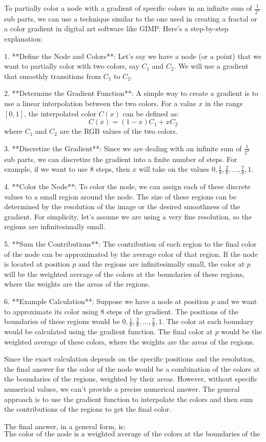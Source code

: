 To partially color a node with a gradient of specific colors in an infinite sum of \(\frac{1}{2^n}\) sub parts, we can use a technique similar to the one used in creating a fractal or a color gradient in digital art software like GIMP. Here's a step-by-step explanation:

1. **Define the Node and Colors**: Let's say we have a node (or a point) that we want to partially color with two colors, say \(C_1\) and \(C_2\). We will use a gradient that smoothly transitions from \(C_1\) to \(C_2\).

2. **Determine the Gradient Function**: A simple way to create a gradient is to use a linear interpolation between the two colors. For a value \(x\) in the range \([0, 1]\), the interpolated color \(C(x)\) can be defined as:
   \[
   C(x) = (1-x)C_1 + xC_2
   \]
   where \(C_1\) and \(C_2\) are the RGB values of the two colors.

3. **Discretize the Gradient**: Since we are dealing with an infinite sum of \(\frac{1}{2^n}\) sub parts, we can discretize the gradient into a finite number of steps. For example, if we want to use 8 steps, then \(x\) will take on the values \(0, \frac{1}{8}, \frac{2}{8}, \ldots, \frac{7}{8}, 1\).

4. **Color the Node**: To color the node, we can assign each of these discrete values to a small region around the node. The size of these regions can be determined by the resolution of the image or the desired smoothness of the gradient. For simplicity, let's assume we are using a very fine resolution, so the regions are infinitesimally small.

5. **Sum the Contributions**: The contribution of each region to the final color of the node can be approximated by the average color of that region. If the node is located at position \(p\) and the regions are infinitesimally small, the color at \(p\) will be the weighted average of the colors at the boundaries of these regions, where the weights are the areas of the regions.

6. **Example Calculation**: Suppose we have a node at position \(p\) and we want to approximate its color using 8 steps of the gradient. The positions of the boundaries of these regions would be \(0, \frac{1}{8}, \frac{2}{8}, \ldots, \frac{7}{8}, 1\). The color at each boundary would be calculated using the gradient function. The final color at \(p\) would be the weighted average of these colors, where the weights are the areas of the regions.

Since the exact calculation depends on the specific positions and the resolution, the final answer for the color of the node would be a combination of the colors at the boundaries of the regions, weighted by their areas. However, without specific numerical values, we can't provide a precise numerical answer. The general approach is to use the gradient function to interpolate the colors and then sum the contributions of the regions to get the final color.

The final answer, in a general form, is:
\[
\boxed{\text{The color of the node is a weighted average of the colors at the boundaries of the regions, where the weights are the areas of the regions.}}
\]